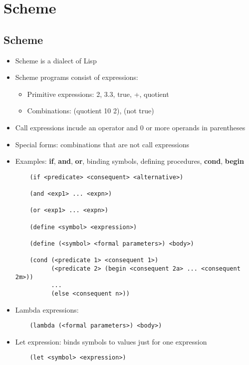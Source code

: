 \chapter{Scheme}

\section{Scheme}
\begin{itemize}
    \item Scheme is a dialect of Lisp
    \item Scheme programs consist of expressions:
    \begin{itemize}
        \item Primitive expressions: 2, 3.3, true, +, quotient
        \item Combinations: (quotient 10 2), (not true)
    \end{itemize}
    \item Call expressions incude an operator and 0 or more operands in parentheses
    \item Special forms: combinations that are not call expressions
    \item Examples: \textbf{if}, \textbf{and}, \textbf{or}, binding symbols, defining procedures, \textbf{cond}, \textbf{begin}
    \begin{verbatim}
    (if <predicate> <consequent> <alternative>)

    (and <exp1> ... <expn>)

    (or <exp1> ... <expn>)

    (define <symbol> <expression>)

    (define (<symbol> <formal parameters>) <body>)

    (cond (<predicate 1> <consequent 1>)
          (<predicate 2> (begin <consequent 2a> ... <consequent 2m>))
          ...
          (else <consequent n>))
    \end{verbatim}
    \item Lambda expressions: 
    \begin{verbatim}
    (lambda (<formal parameters>) <body>)
    \end{verbatim}
    \item Let expression: binds symbols to values just for one expression
    \begin{verbatim}
    (let <symbol> <expression>)
    \end{verbatim}
\end{itemize}

